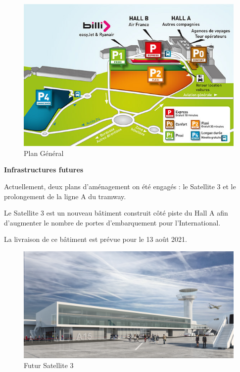 \begin{figure}[hbt!]
    \centering
    \includegraphics[width=12cm]{Images/plan.jpg}
    \caption{Plan Général}
    \label{fig:plangeneral}
\end{figure}

\newpage

\textbf{Infrastructures futures}\newline

Actuellement, deux plans d'aménagement on été engagés : le Satellite 3 et le prolongement de la ligne A du tramway.

Le Satellite 3 est un nouveau bâtiment construit côté piste du Hall A afin d'augmenter le nombre de portes d'embarquement pour l'International.

La livraison de ce bâtiment est prévue pour le 13 août 2021.\newline

\begin{figure}[hbt!]
    \centering
    \includegraphics[width=13cm]{Images/satellite3.jpg}
    \caption{Futur Satellite 3}
    \label{fig:sat3}
\end{figure}

